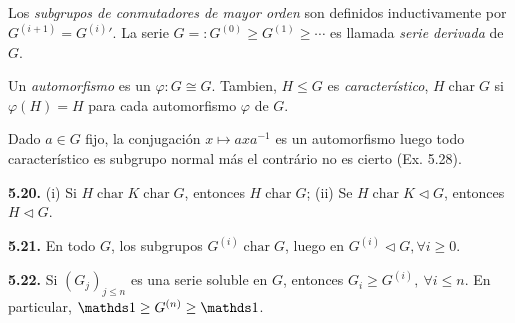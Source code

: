 \begin{definition}
    Los \emph{subgrupos de conmutadores de mayor orden} son definidos inductivamente por \(G^{(i+1)} = G^{(i)}{'}\). La serie \(G =: G^{(0)}\geq G^{(1)} \geq \cdots\) es llamada \emph{serie derivada} de \(G\). 
\end{definition}

\begin{definition}
    Un \emph{automorfismo} es un \(\varphi: G \cong G\). Tambien, \(H \leq G\) es \emph{característico}, \(H \operatorname{char} G\) si \(\varphi(H) = H\) para cada automorfismo \(\varphi \) de \(G\). 
\end{definition}

\begin{note}
    Dado \(a \in G\) fijo, la conjugación \(x \mapsto axa^{-1} \) es un automorfismo luego todo característico es subgrupo normal más el contrário no es cierto (\textcolor{rojoscuro}{Ex. 5.28}).
\end{note}

\hypertarget{lemma520}{}
\begin{lemma}
    \textbf{5.20.} (i) Si \(H \operatorname{char} K \operatorname{char} G\), entonces \(H \operatorname{char} G\); (ii) Se \(H \operatorname{char} K \lhd G\), entonces \(H \lhd G\).  
\end{lemma}

\begin{theorem}
    \textbf{5.21.} En todo \(G\), los subgrupos \(G^{(i)} \operatorname{char} G\), luego en \(G^{(i)} \lhd G, \forall i\geq 0\). 
\end{theorem}


\hypertarget{lemma522}{}
\begin{lemma}
    \textbf{5.22.} Si \((G_j)_{j\leq n}\) es una serie soluble en \(G\), entonces \(G_i \geq G^{(i)}, \ \forall i\leq n\). En particular, \(\id \geq G^{(n)}\geq \id\). 
\end{lemma}


